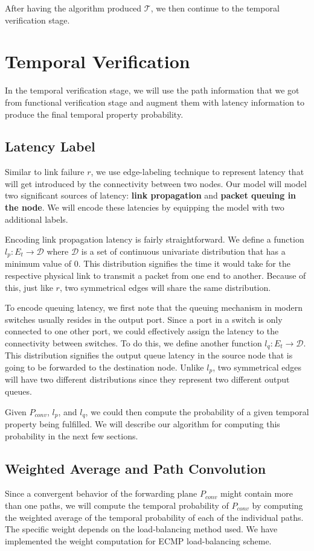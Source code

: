 \documentclass[10pt,sigconf,letterpaper,anonymous,nonacm]{acmart}
\begin{document}
After having the algorithm produced $\mathcal{T}$, we then continue to the temporal verification 
stage.

\section{Temporal Verification}
In the temporal verification stage, we will use the path information that we got from 
functional verification stage and augment them with latency information to 
produce the final temporal property probability.

\subsection{Latency Label}
Similar to link failure $r$, we use edge-labeling technique to represent latency that 
will get introduced by the connectivity between two nodes. 
Our model will model two significant sources of latency: \textbf{link propagation} 
and \textbf{packet queuing in the node}.
We will encode these latencies by equipping the model with two additional labels.

Encoding link propagation latency is fairly straightforward. 
We define a function $l_p: E_t \rightarrow \mathcal{D}$ where $\mathcal{D}$ is a set of 
continuous univariate distribution that has a minimum value of $0$.
This distribution signifies the time it would take for the respective physical link to transmit 
a packet from one end to another.
Because of this, just like $r$, two symmetrical edges will share the same distribution.

To encode queuing latency, we first note that the queuing mechanism in modern switches 
usually resides in the output port. %
Since a port in a switch is only connected to one other port, we could effectively 
assign the latency to the connectivity between switches.
To do this, we define another function $l_q: E_t \rightarrow \mathcal{D}$.
This distribution signifies the output queue latency in the source node that is 
going to be forwarded to the destination node.
Unlike $l_p$, two symmetrical edges will have two different distributions since they 
represent two different output queues.

Given $P_{conv}$, $l_p$, and $l_q$, we could then compute the probability of a given 
temporal property being fulfilled.
We will describe our algorithm for computing this probability in the next few 
sections.

\subsection{Weighted Average and Path Convolution}
Since a convergent behavior of the forwarding plane $P_{conv}$ might contain more than 
one paths, we will compute the temporal probability of $P_{conv}$ by computing the 
weighted average of the temporal probability of each of the individual paths.
The specific weight depends on the load-balancing method used.
We have implemented the weight computation for ECMP load-balancing scheme.
\end{document}
